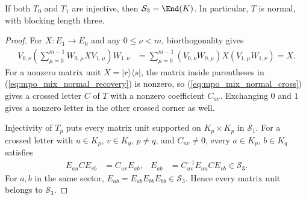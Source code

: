 \begin{lemma}
    \label{thm:mpo_mixed_normality}
    \leanok
    If both $T_0$ and $T_1$ are injective, then
    $\mathcal S_3=\End(K)$. In particular, $T$ is normal, with
    blocking length three.
\end{lemma}
\begin{proof}
    \leanok
    For $X:E_1\to E_0$ and any $0\leq\nu<m$, biorthogonality gives
    \begin{align}
        V_{0,\nu}\left(\sum_{\mu=0}^{m-1}W_{0,\mu}XV_{1,\mu}\right)W_{1,\nu}
         & =\sum_{\mu=0}^{m-1}
        (V_{0,\nu}W_{0,\mu})X(V_{1,\mu}W_{1,\nu})=X.
        \label{eq:mpo_mix_normal_recovery}
    \end{align}
    For a nonzero matrix unit $X=|r\rangle\langle s|$,
    the matrix inside parentheses in
    (\ref{eq:mpo_mix_normal_recovery}) is nonzero, so
    (\ref{eq:mpo_mix_normal_cross}) gives a crossed letter $C$ of $T$
    with a nonzero coefficient $C_{uv}$.
    Exchanging $0$ and $1$ gives a nonzero letter in the other
    crossed corner as well.

    Injectivity of $T_p$ puts every matrix unit supported on
    $K_p\times K_p$ in $\mathcal S_1$. For a crossed letter with
    $u\in K_p$, $v\in K_q$, $p\ne q$, and $C_{uv}\ne0$, every
    $a\in K_p$, $b\in K_q$ satisfies
    \begin{align}
        E_{au}CE_{vb} & =C_{uv}E_{ab},
                      & E_{ab}         & =C_{uv}^{-1}E_{au}CE_{vb}\in\mathcal S_3.
        \label{eq:mpo_mix_normal_sandwich}
    \end{align}
    For $a,b$ in the same sector,
    $E_{ab}=E_{ab}E_{bb}E_{bb}\in\mathcal S_3$.
    Hence every matrix unit belongs to $\mathcal S_3$.
\end{proof}

